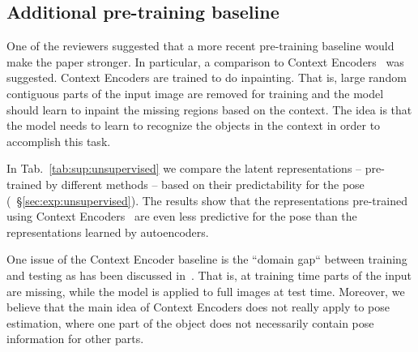 \documentclass[10pt,twocolumn,letterpaper]{article}
\begin{document}
\subsection{Additional pre-training baseline}\label{sec:sup:contextencodercomparison}
One of the reviewers suggested that a more recent pre-training baseline would 
make the paper stronger.
In particular, a comparison to Context Encoders~\cite{Pathak2016cvpr_contextencoders} 
was suggested.
Context Encoders are trained to do inpainting. 
That is, large random contiguous parts of the input image are removed for training and 
the model should learn to inpaint the missing regions based on the context.
The idea is that the model needs to learn to recognize the objects 
in the context in order to accomplish this task.

In Tab.~\ref{tab:sup:unsupervised} we compare the latent representations --
pre-trained by different methods -- based on their predictability for the pose 
(\cf~\S\ref{sec:exp:unsupervised}).
The results show that the representations pre-trained using 
Context Encoders~\cite{Pathak2016cvpr_contextencoders} 
are even less predictive for the pose than the representations learned by autoencoders.

One issue of the Context Encoder baseline is the ``domain gap`` between training and testing 
as has been discussed in~\cite{Zhang2017cvpr_splitbrainautoenc}.
That is, at training time parts of the input are missing, 
while the model is applied to full images at test time.
Moreover, we believe that the main idea of Context Encoders does not really apply to 
pose estimation, where one part of the object does not necessarily contain pose information 
for other parts.
\end{document}
